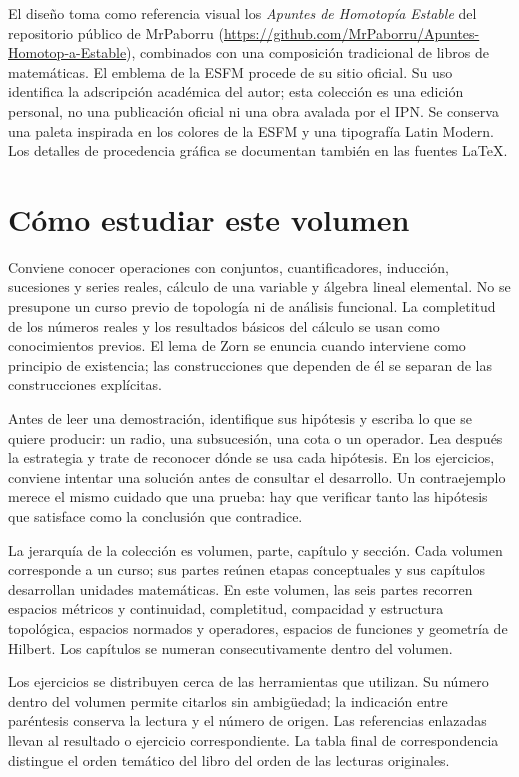 El diseño toma como referencia visual los \emph{Apuntes de Homotopía Estable} del repositorio público de MrPaborru (\url{https://github.com/MrPaborru/Apuntes-Homotop-a-Estable}), combinados con una composición tradicional de libros de matemáticas. El emblema de la ESFM procede de su sitio oficial. Su uso identifica la adscripción académica del autor; esta colección es una edición personal, no una publicación oficial ni una obra avalada por el IPN. Se conserva una paleta inspirada en los colores de la ESFM y una tipografía Latin Modern. Los detalles de procedencia gráfica se documentan también en las fuentes LaTeX.

\section*{Cómo estudiar este volumen}
Conviene conocer operaciones con conjuntos, cuantificadores, inducción, sucesiones y series reales, cálculo de una variable y álgebra lineal elemental. No se presupone un curso previo de topología ni de análisis funcional. La completitud de los números reales y los resultados básicos del cálculo se usan como conocimientos previos. El lema de Zorn se enuncia cuando interviene como principio de existencia; las construcciones que dependen de él se separan de las construcciones explícitas.

Antes de leer una demostración, identifique sus hipótesis y escriba lo que se quiere producir: un radio, una subsucesión, una cota o un operador. Lea después la estrategia y trate de reconocer dónde se usa cada hipótesis. En los ejercicios, conviene intentar una solución antes de consultar el desarrollo. Un contraejemplo merece el mismo cuidado que una prueba: hay que verificar tanto las hipótesis que satisface como la conclusión que contradice.

La jerarquía de la colección es volumen, parte, capítulo y sección. Cada volumen corresponde a un curso; sus partes reúnen etapas conceptuales y sus capítulos desarrollan unidades matemáticas. En este volumen, las seis partes recorren espacios métricos y continuidad, completitud, compacidad y estructura topológica, espacios normados y operadores, espacios de funciones y geometría de Hilbert. Los capítulos se numeran consecutivamente dentro del volumen.

Los ejercicios se distribuyen cerca de las herramientas que utilizan. Su número dentro del volumen permite citarlos sin ambigüedad; la indicación entre paréntesis conserva la lectura y el número de origen. Las referencias enlazadas llevan al resultado o ejercicio correspondiente. La tabla final de correspondencia distingue el orden temático del libro del orden de las lecturas originales.

